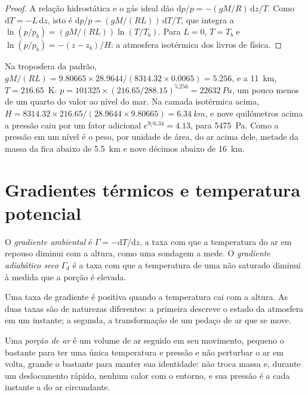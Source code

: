 \begin{proof}
A relação hidrostática e o gás ideal dão $\mathrm dp/p = -(gM/R)\,\mathrm
dz/T$. Como $\mathrm dT = -L\,\mathrm dz$, isto é $\mathrm dp/p =
(gM/(RL))\,\mathrm dT/T$, que integra a $\ln(p/p_b) = (gM/(RL))
\ln(T/T_b)$. Para $L = 0$, $T = T_b$ e $\ln(p/p_b) = -(z - z_b)/H$: a
atmosfera isotérmica dos livros de física.
\end{proof}

Na troposfera da padrão, $gM/(RL) = 9.80665 \times 28.9644 /
(8314.32 \times 0.0065) = 5.256$, e a \qty{11}{km}, $T = 216.65$~K:
$p = \num{101325} \times (216.65/288.15)^{5.256} = \qty{22632}{Pa}$, um pouco
menos de um quarto do valor ao nível do mar. Na camada isotérmica acima, $H =
8314.32 \times 216.65/(28.9644 \times 9.80665) = \qty{6.34}{km}$, e nove
quilômetros acima a pressão caiu por um fator adicional $e^{9/6.34} =
4.13$, para \qty{5475}{Pa}. Como a pressão em um nível é o peso, por unidade de
área, do ar acima dele, metade da massa da  fica abaixo de
\qty{5.5}{km} e nove décimos abaixo de \qty{16}{km}.

\section{Gradientes térmicos e temperatura potencial}\label{sec:b1:fluid-envelopes-structure:lapse}

\begin{definition}\label{def:b1:fluid-envelopes-structure:lapse-rate}
O \emph{gradiente ambiental} é $\Gamma =
-\mathrm dT/\mathrm dz$, a taxa com que a temperatura do ar em repouso diminui com a altura,
como uma sondagem a mede. O \emph{gradiente adiabático seco}
$\Gamma_d$ é a taxa com que a temperatura de uma  não saturado diminui à medida que
a porção é elevada.
\end{definition}

Uma taxa de gradiente é positiva quando a temperatura cai com a altura. As duas taxas são de
naturezas diferentes: a primeira descreve o estado da atmosfera em um instante; a segunda, a
transformação de um pedaço de ar que se move.

\begin{definition}[Porção de ar]\label{def:b1:fluid-envelopes-structure:parcel}
Uma \emph{porção de ar} é um volume de ar seguido em seu movimento, pequeno o
bastante para ter uma única temperatura e pressão e não perturbar o ar em volta, grande o bastante
para manter sua identidade: não troca massa e, durante um deslocamento rápido, nenhum calor com o
entorno, e sua pressão é a cada instante a do ar circundante.
\end{definition}

